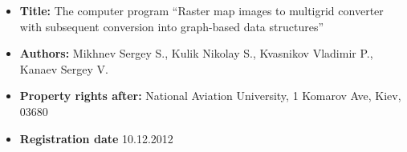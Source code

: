 \documentclass[11pt,a4paper,russian]{moderncv}
\begin{document}
\begin{itemize}
\item \textbf{Title:} The computer program ``Raster map images to multigrid converter with subsequent conversion into graph-based data structures''
\item \textbf{Authors:} Mikhnev Sergey S., Kulik Nikolay S., Kvasnikov Vladimir P., Kanaev Sergey V.
\item \textbf{Property rights after:} National Aviation University, 1 Komarov Ave, Kiev, 03680
\item \textbf{Registration date} 10.12.2012
\end{itemize}

\clearpage
\end{document}
